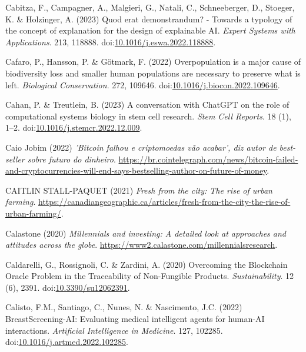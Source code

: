 \documentclass[
  letterpaper,
  DIV=11,
  numbers=noendperiod]{scrartcl}
\newlength{\cslhangindent}
\newenvironment{CSLReferences}[2] %
 {\begin{list}{}{%
  \setlength{\itemindent}{0pt}
  \setlength{\leftmargin}{0pt}
  \setlength{\parsep}{0pt}
  \ifodd #1
   \setlength{\leftmargin}{\cslhangindent}
   \setlength{\itemindent}{-1\cslhangindent}
  \fi
  \setlength{\itemsep}{#2\baselineskip}}}
 {\end{list}}
\begin{document}
\begin{CSLReferences}{0}{1}
Cabitza, F., Campagner, A., Malgieri, G., Natali, C., Schneeberger, D.,
Stoeger, K. \& Holzinger, A. (2023) Quod erat demonstrandum? - {Towards}
a typology of the concept of explanation for the design of explainable
{AI}. \emph{Expert Systems with Applications}. 213, 118888.
doi:\href{https://doi.org/10.1016/j.eswa.2022.118888}{10.1016/j.eswa.2022.118888}.

Cafaro, P., Hansson, P. \& Götmark, F. (2022) Overpopulation is a major
cause of biodiversity loss and smaller human populations are necessary
to preserve what is left. \emph{Biological Conservation}. 272, 109646.
doi:\href{https://doi.org/10.1016/j.biocon.2022.109646}{10.1016/j.biocon.2022.109646}.

Cahan, P. \& Treutlein, B. (2023) A conversation with {ChatGPT} on the
role of computational systems biology in stem cell research. \emph{Stem
Cell Reports}. 18 (1), 1--2.
doi:\href{https://doi.org/10.1016/j.stemcr.2022.12.009}{10.1016/j.stemcr.2022.12.009}.

Caio Jobim (2022) \emph{'{Bitcoin} falhou e criptomoedas v{ã}o acabar',
diz autor de best-seller sobre futuro do dinheiro}.
\url{https://br.cointelegraph.com/news/bitcoin-failed-and-cryptocurrencies-will-end-says-bestselling-author-on-future-of-money}.

CAITLIN STALL-PAQUET (2021) \emph{Fresh from the city: {The} rise of
urban farming}.
\url{https://canadiangeographic.ca/articles/fresh-from-the-city-the-rise-of-urban-farming/}.

Calastone (2020) \emph{Millennials and investing: A detailed look at
approaches and attitudes across the globe}.
\url{https://www2.calastone.com/millennialsresearch}.

Caldarelli, G., Rossignoli, C. \& Zardini, A. (2020) Overcoming the
{Blockchain Oracle Problem} in the {Traceability} of {Non-Fungible
Products}. \emph{Sustainability}. 12 (6), 2391.
doi:\href{https://doi.org/10.3390/su12062391}{10.3390/su12062391}.

Calisto, F.M., Santiago, C., Nunes, N. \& Nascimento, J.C. (2022)
{BreastScreening-AI}: {Evaluating} medical intelligent agents for
human-{AI} interactions. \emph{Artificial Intelligence in Medicine}.
127, 102285.
doi:\href{https://doi.org/10.1016/j.artmed.2022.102285}{10.1016/j.artmed.2022.102285}.


\end{CSLReferences}
\end{document}
